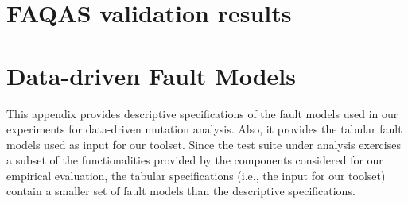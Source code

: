 \documentclass[11pt,twoside]{book}
\newcommand{\STARTCHANGEDWPT}{\color{black}}
\newcommand{\ENDCHANGEDWPT}{\color{black}}
\newcommand{\REVFINAL}[2]{\todo{\tiny{#1}}\textcolor{blue}{#2}}
\begin{document}
\newcommand{\prog}{P}
\newcommand{\prop}{}





\newcommand{\STARTCHANGEDFINAL}{\color{blue}}
\newcommand{\ENDCHANGEDFINAL}{\color{black}}


\thispagestyle{empty}









\tableofcontents









\chapter{FAQAS validation results}
\label{ch:results}



\STARTCHANGEDWPT







\ENDCHANGEDWPT



\newpage

\appendix


\chapter{Data-driven Fault Models}
\label{appendix:FMS}

This appendix provides descriptive specifications of the fault models used in our experiments for data-driven mutation analysis. Also, it provides the tabular fault models used as input for our toolset. Since the test suite under analysis exercises a subset of the functionalities provided by the components considered for our empirical evaluation, the tabular specifications (i.e., the input for our toolset) contain a smaller set of fault models than the descriptive specifications.
\end{document}
